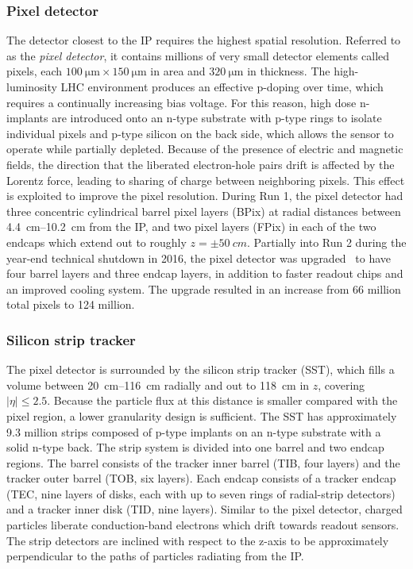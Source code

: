 \subsubsection{Pixel detector}
The detector closest to the IP requires the highest spatial resolution. Referred
to as the \textit{pixel detector}, it contains millions of very small detector
elements called pixels, each $\SI{100}{\micro\meter} \times
\SI{150}{\micro\meter}$ in area and $\SI{320}{\micro\meter}$ in thickness. The
high-luminosity LHC environment produces an effective p-doping over time, which
requires a continually increasing bias voltage. For this reason, high dose
n-implants are introduced onto an n-type substrate with p-type rings to isolate
individual pixels and p-type silicon on the back side, which allows the sensor
to operate while partially depleted. Because of the presence of electric and
magnetic fields, the direction that the liberated electron-hole pairs drift is
affected by the Lorentz force, leading to sharing of charge between neighboring
pixels. This effect is exploited to improve the pixel resolution. During Run 1,
the pixel detector had three concentric cylindrical barrel pixel layers (BPix)
at radial distances between \SIrange{4.4}{10.2}{\centi\meter} from the IP, and
two pixel layers (FPix) in each of the two endcaps which extend out to roughly
$z=\pm\SI{50}{cm}$. Partially into Run 2 during the year-end technical shutdown
in 2016, the pixel detector was upgraded~\cite{1748-0221-12-02-C02033} to have
four barrel layers and three endcap layers, in addition to faster readout chips
and an improved cooling system. The upgrade resulted in an increase from
\num{66} million total pixels to 124 million.

\subsubsection{Silicon strip tracker}
The pixel detector is surrounded by the silicon strip tracker (SST), which fills
a volume between \SIrange{20}{116}{\centi\meter} radially and out to
\SI{118}{\centi\meter} in $z$, covering $|\eta| \leq 2.5$. Because the particle
flux at this distance is smaller compared with the pixel region, a lower
granularity design is sufficient. The SST has approximately \num{9.3} million
strips composed of p-type implants on an n-type substrate with a solid n-type
back. The strip system is divided into one barrel and two endcap regions. The
barrel consists of the tracker inner barrel (TIB, four layers) and the tracker
outer barrel (TOB, six layers). Each endcap consists of a tracker endcap (TEC,
nine layers of disks, each with up to seven rings of radial-strip detectors) and
a tracker inner disk (TID, nine layers). Similar to the pixel detector, charged
particles liberate conduction-band electrons which drift towards readout
sensors. The strip detectors are inclined with respect to the z-axis to be
approximately perpendicular to the paths of particles radiating from the IP.

